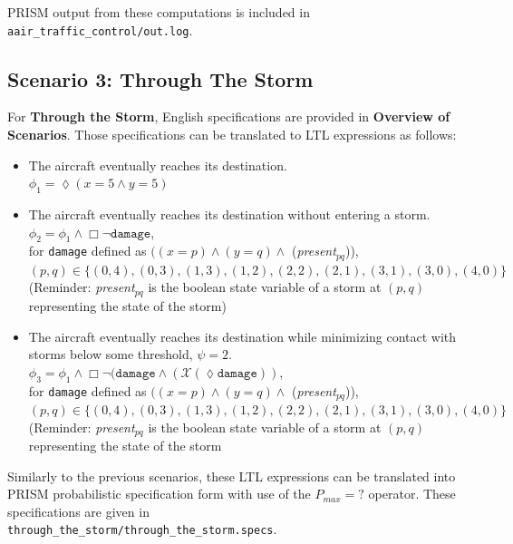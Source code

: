\documentclass{article}
\begin{document}
PRISM output from these computations is included in \texttt{aair\_traffic\_control/out.log}.

\subsection*{Scenario 3: Through The Storm}

For \textbf{Through the Storm}, English specifications are provided in \textbf{Overview of Scenarios}. Those specifications can be translated to LTL expressions as follows:

\begin{itemize}
 \item The aircraft eventually reaches its destination. \\
 $\phi_1= \lozenge (x=5 \land y=5)$

 \item The aircraft eventually reaches its destination without entering a storm. \\
 $\phi_2= \phi_1 \land \Box\lnot\texttt{damage}$, \\
 for \texttt{damage} defined as $((x = p) \land (y = q) \land $ (\textit{present}$_{pq}$)), $(p,q)\in\{(0,4), (0,3), (1,3), (1,2), (2,2), (2,1), (3,1), (3,0), (4,0)\}$ \\
 (Reminder: \textit{present}$_{pq}$ is the boolean state variable of a storm at $(p,q)$ representing the state of the storm)

 \item The aircraft eventually reaches its destination while minimizing contact with storms below some threshold, $\psi = 2$. \\
 $\phi_3= \phi_1 \land \Box\lnot(\texttt{damage} \land (\mathcal{X}(\lozenge\texttt{damage}))$, \\
  for \texttt{damage} defined as $((x = p) \land (y = q) \land $ (\textit{present}$_{pq}$)), $(p,q)\in\{(0,4), (0,3), (1,3), (1,2), (2,2), (2,1), (3,1), (3,0), (4,0)\}$
 (Reminder: \textit{present}$_{pq}$ is the boolean state variable of a storm at $(p,q)$ representing the state of the storm
\end{itemize}

Similarly to the previous scenarios, these LTL expressions can be translated into PRISM probabilistic specification form with use of the $P_{max}=?$ operator. These specifications are given in \\
\texttt{through\_the\_storm/through\_the\_storm.specs}.\\
\end{document}
